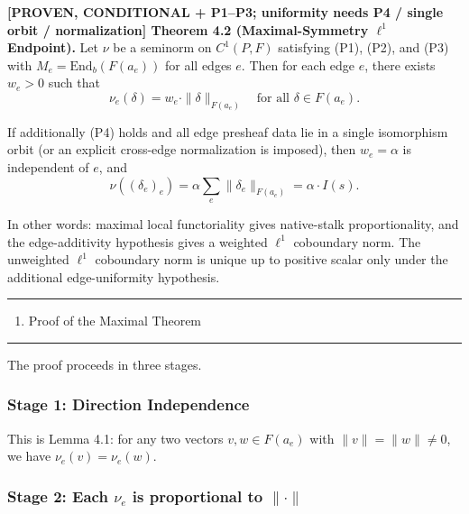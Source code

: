 \documentclass[
  11pt,
]{article}
\providecommand{\tightlist}{%
  \setlength{\itemsep}{0pt}\setlength{\parskip}{0pt}}
\providecommand{\tightlist}{%
  \setlength{\itemsep}{0pt}\setlength{\parskip}{0pt}}
\renewenvironment{quote}
  {\begin{leftbar}\small}
  {\end{leftbar}}
\begin{document}
\begin{quote}
\textbf{{[}PROVEN, CONDITIONAL + P1--P3; uniformity needs P4 / single orbit / normalization{]} Theorem 4.2 (Maximal-Symmetry \(\ell^1\) Endpoint).} Let \(\nu\) be a seminorm on \(C^1(P, F)\) satisfying (P1), (P2), and (P3) with \(M_e = \mathrm{End}_b(F(a_e))\) for all edges \(e\). Then for each edge \(e\), there exists \(w_e > 0\) such that
\[\nu_e(\delta) = w_e \cdot \|\delta\|_{F(a_e)} \quad \text{for all } \delta \in F(a_e).\]

If additionally (P4) holds and all edge presheaf data lie in a single isomorphism orbit (or an explicit cross-edge normalization is imposed), then \(w_e = \alpha\) is independent of \(e\), and
\[\nu((\delta_e)_e) = \alpha \sum_{e} \|\delta_e\|_{F(a_e)} = \alpha \cdot I(s).\]

In other words: maximal local functoriality gives native-stalk proportionality, and the edge-additivity hypothesis gives a weighted \(\ell^1\) coboundary norm. The unweighted \(\ell^1\) coboundary norm is unique up to positive scalar only under the additional edge-uniformity hypothesis.
\end{quote}

\begin{center}\rule{0.5\linewidth}{0.5pt}\end{center}

\begin{enumerate}
\def\labelenumi{\arabic{enumi}.}
\setcounter{enumi}{4}
\tightlist
\item
  Proof of the Maximal Theorem
\end{enumerate}

\begin{center}\rule{0.5\linewidth}{0.5pt}\end{center}

The proof proceeds in three stages.

\subsubsection{Stage 1: Direction Independence}\label{stage-1-direction-independence}

This is Lemma 4.1: for any two vectors \(v, w \in F(a_e)\) with \(\|v\| = \|w\| \neq 0\), we have \(\nu_e(v) = \nu_e(w)\).

\subsubsection{\texorpdfstring{Stage 2: Each \(\nu_e\) is proportional to \(\|\cdot\|\)}{Stage 2: Each \textbackslash nu\_e is proportional to \textbackslash\textbar\textbackslash cdot\textbackslash\textbar{}}}\label{stage-2-each-nu_e-is-proportional-to-cdot}
\end{document}
